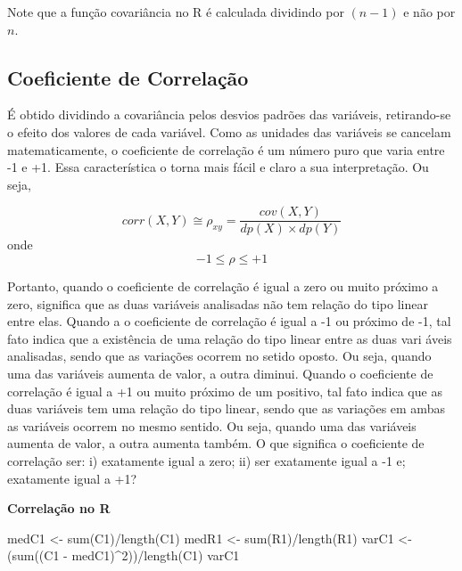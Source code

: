 \documentclass[
]{book}
\newenvironment{Shaded}{\begin{snugshade}}{\end{snugshade}}
\newcommand{\DecValTok}[1]{\textcolor[rgb]{0.00,0.00,0.81}{#1}}
\newcommand{\FunctionTok}[1]{\textcolor[rgb]{0.00,0.00,0.00}{#1}}
\newcommand{\NormalTok}[1]{#1}
\newcommand{\OtherTok}[1]{\textcolor[rgb]{0.56,0.35,0.01}{#1}}
\newcommand{\SpecialCharTok}[1]{\textcolor[rgb]{0.00,0.00,0.00}{#1}}
\begin{document}
Note que a função covariância no R é calculada dividindo por \((n-1)\) e não por \(n\).

\hypertarget{coeficiente-de-correlauxe7uxe3o}{%
\subsection{Coeficiente de Correlação}\label{coeficiente-de-correlauxe7uxe3o}}

É obtido dividindo a covariância pelos desvios padrões das variáveis, retirando-se o efeito dos valores de cada variável. Como as unidades das variáveis se cancelam matematicamente, o coeficiente de correlação é um número puro que varia entre -1 e +1. Essa característica o torna mais fácil e claro a sua interpretação. Ou seja,

\begin{equation*}
 corr(X,Y) \cong \rho_{xy} = \frac{cov(X,Y)}{dp(X) \times dp(Y)}
\end{equation*}
onde
\begin{equation*}
  -1 \leq \rho \leq +1
\end{equation*}

Portanto, quando o coeficiente de correlação é igual a zero ou muito próximo a zero, significa que as duas variáveis analisadas não tem relação do tipo linear entre elas. Quando a o coeficiente de correlação é igual a -1 ou próximo de -1, tal fato indica que a existência de uma relação do tipo linear entre as duas vari
áveis analisadas, sendo que as variações ocorrem no setido oposto. Ou seja, quando uma das variáveis aumenta de valor, a outra diminui. Quando o coeficiente de correlação é igual a +1 ou muito próximo de um positivo, tal fato indica que as duas variáveis tem uma relação do tipo linear, sendo que as variações em ambas as variáveis ocorrem no mesmo sentido. Ou seja, quando uma das variáveis aumenta de valor, a outra aumenta também. O que significa o coeficiente de correlação ser: i) exatamente igual a zero; ii) ser exatamente igual a -1 e; exatamente igual a +1?

\textbf{Correlação no R}

\begin{Shaded}
\begin{Highlighting}[]
\NormalTok{medC1 }\OtherTok{\textless{}{-}} \FunctionTok{sum}\NormalTok{(C1)}\SpecialCharTok{/}\FunctionTok{length}\NormalTok{(C1)}
\NormalTok{medR1 }\OtherTok{\textless{}{-}} \FunctionTok{sum}\NormalTok{(R1)}\SpecialCharTok{/}\FunctionTok{length}\NormalTok{(R1)}
\NormalTok{varC1 }\OtherTok{\textless{}{-}}\NormalTok{ (}\FunctionTok{sum}\NormalTok{((C1 }\SpecialCharTok{{-}}\NormalTok{ medC1)}\SpecialCharTok{\^{}}\DecValTok{2}\NormalTok{))}\SpecialCharTok{/}\FunctionTok{length}\NormalTok{(C1)}
\NormalTok{varC1}
\end{Highlighting}
\end{Shaded}
\end{document}
